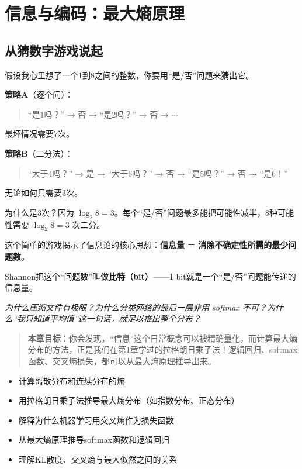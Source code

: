 \chapter{信息与编码：最大熵原理}

\section*{从猜数字游戏说起}

假设我心里想了一个1到8之间的整数，你要用“是/否”问题来猜出它。

\textbf{策略A}（逐个问）：
\begin{quote}
“是1吗？” → 否 → “是2吗？” → 否 → $\cdots$
\end{quote}
最坏情况需要7次。

\textbf{策略B}（二分法）：
\begin{quote}
“大于4吗？” → 是 → “大于6吗？” → 否 → “是5吗？” → 否 → “是6！”
\end{quote}
无论如何只需要3次。

为什么是3次？因为 $\log_2 8 = 3$。每个“是/否”问题最多能把可能性减半，8种可能性需要 $\log_2 8 = 3$ 次二分。

\begin{insightbox}
这个简单的游戏揭示了信息论的核心思想：\textbf{信息量 = 消除不确定性所需的最少问题数}。

Shannon把这个“问题数”叫做\textbf{比特（bit）}——1 bit就是一个“是/否”问题能传递的信息量。
\end{insightbox}


\vspace{0.5cm}
\noindent\textit{为什么压缩文件有极限？为什么分类网络的最后一层非用 softmax 不可？为什么“我只知道平均值”这一句话，就足以推出整个分布？}

\begin{quote}
\textbf{本章目标}：你会发现，“信息”这个日常概念可以被精确量化，而计算最大熵分布的方法，正是我们在第1章学过的拉格朗日乘子法！逻辑回归、softmax函数、交叉熵损失，都可以从最大熵原理推导出来。
\end{quote}

\begin{tcolorbox}[colback=green!5, colframe=green!60!black, title=学完这章，你将能够...]
\begin{itemize}
    \item 计算离散分布和连续分布的熵
    \item 用拉格朗日乘子法推导最大熵分布（如指数分布、正态分布）
    \item 解释为什么机器学习用交叉熵作为损失函数
    \item 从最大熵原理推导softmax函数和逻辑回归
    \item 理解KL散度、交叉熵与最大似然之间的关系
\end{itemize}
\end{tcolorbox}


